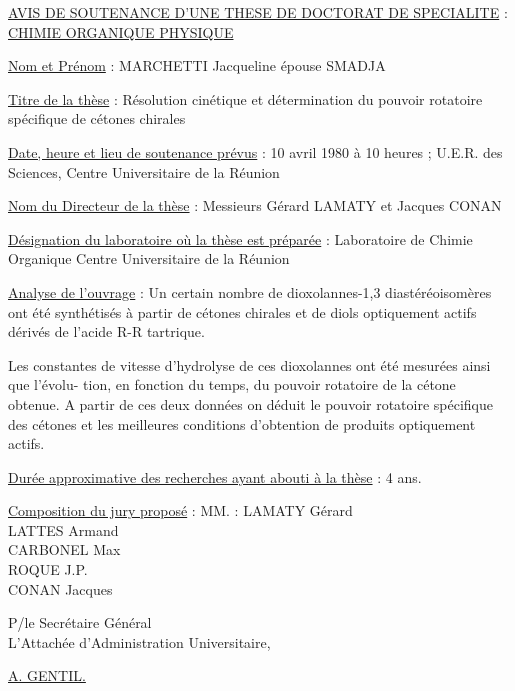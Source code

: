 \begin{center}
\uline{AVIS DE SOUTENANCE D'UNE THESE DE DOCTORAT DE SPECIALITE} :\\
\uline{CHIMIE ORGANIQUE PHYSIQUE}
\end{center}
\uline{Nom et Prénom} : MARCHETTI Jacqueline épouse SMADJA

\uline{Titre de la thèse} : Résolution cinétique et détermination du pouvoir rotatoire spécifique
de cétones chirales

\uline{Date, heure et lieu de soutenance prévus} : 10 avril 1980 à 10 heures ; U.E.R. des Sciences,
Centre Universitaire de la Réunion

\uline{Nom du Directeur de la thèse} : Messieurs Gérard LAMATY et Jacques CONAN

\uline{Désignation du laboratoire où la thèse est préparée} :
Laboratoire de Chimie Organique Centre Universitaire de la Réunion

\uline{Analyse de l'ouvrage} :
Un certain nombre de dioxolannes-1,3 diastéréoisomères ont été synthétisés à partir de cétones
chirales et de diols optiquement actifs dérivés de l'acide R-R tartrique.

Les constantes de vitesse d'hydrolyse de ces dioxolannes ont été mesurées ainsi que l'évolu-
tion, en fonction du temps, du pouvoir rotatoire de la cétone obtenue. A partir de ces deux
données on déduit le pouvoir rotatoire spécifique des cétones et les meilleures conditions
d'obtention de produits optiquement actifs.

\uline{Durée approximative des recherches ayant abouti à la thèse} : 4 ans.

\uline{Composition du jury proposé} : MM. : LAMATY Gérard\\
LATTES Armand\\
CARBONEL Max\\
ROQUE J.P.\\
CONAN Jacques

P/le Secrétaire Général\\
L'Attachée d'Administration Universitaire,

\uline{A. GENTIL.}

